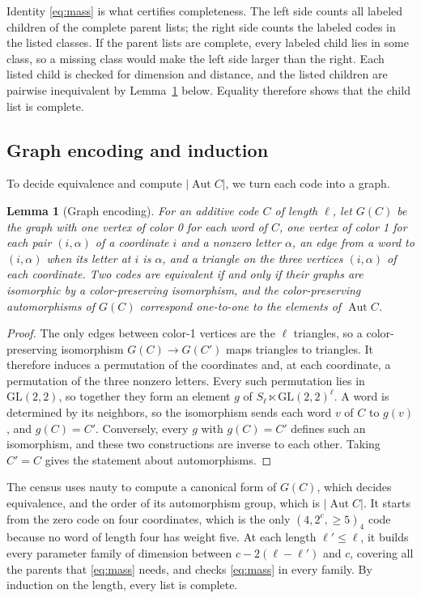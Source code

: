 \documentclass[11pt]{article}
\newtheorem{lemma}[theorem]{Lemma}
\theoremstyle{definition}
\theoremstyle{remark}
\newcommand{\Aut}{\operatorname{Aut}}
\begin{document}
Identity \eqref{eq:mass} is what certifies completeness. The left side
counts all labeled children of the complete parent lists; the right
side counts the labeled codes in the listed classes. If the parent lists
are complete, every labeled child lies in some class, so a missing class
would make the left side larger than the right. Each listed child is
checked for dimension and distance, and the listed children are
pairwise inequivalent by Lemma~\ref{lem:graph} below. Equality therefore
shows that the child list is complete.

\subsection{Graph encoding and induction}

To decide equivalence and compute \(|\Aut C|\), we turn each code into a
graph.

\begin{lemma}[Graph encoding]\label{lem:graph}
For an additive code \(C\) of length \(\ell\), let \(G(C)\) be the
graph with one vertex of color 0 for each word of \(C\), one vertex of
color 1 for each pair \((i,\alpha)\) of a coordinate \(i\) and a nonzero
letter \(\alpha\), an edge from a word to \((i,\alpha)\) when its letter at
\(i\) is \(\alpha\), and a triangle on the three vertices \((i,\alpha)\) of
each coordinate. Two codes are equivalent if and only if their graphs
are isomorphic by a color-preserving isomorphism, and the
color-preserving automorphisms of \(G(C)\) correspond one-to-one to the
elements of \(\Aut C\).
\end{lemma}
\begin{proof}
The only edges between color-1 vertices are the \(\ell\) triangles, so a
color-preserving isomorphism \(G(C)\to G(C')\) maps triangles to
triangles. It therefore induces a permutation of the coordinates and, at
each coordinate, a permutation of the three nonzero letters. Every such
permutation lies in \(\mathrm{GL}(2,2)\), so together they form an
element \(g\) of \(S_\ell\ltimes\mathrm{GL}(2,2)^\ell\). A word is
determined by its neighbors, so the isomorphism sends each word \(v\) of
\(C\) to \(g(v)\), and \(g(C)=C'\). Conversely, every \(g\) with
\(g(C)=C'\) defines such an isomorphism, and these two constructions are
inverse to each other. Taking \(C'=C\) gives the statement about
automorphisms.
\end{proof}

The census uses nauty \cite{nauty} to compute a canonical form of
\(G(C)\), which decides equivalence, and the order of its automorphism
group, which is \(|\Aut C|\). It starts from the zero code on four
coordinates, which is the only \((4,2^c,{\geq}5)_4\) code because no word
of length four has weight five. At each length \(\ell'\leq\ell\), it
builds every parameter family of dimension between \(c-2(\ell-\ell')\)
and \(c\), covering all the parents that \eqref{eq:mass} needs, and
checks \eqref{eq:mass} in every family. By induction on the length,
every list is complete.
\end{document}
